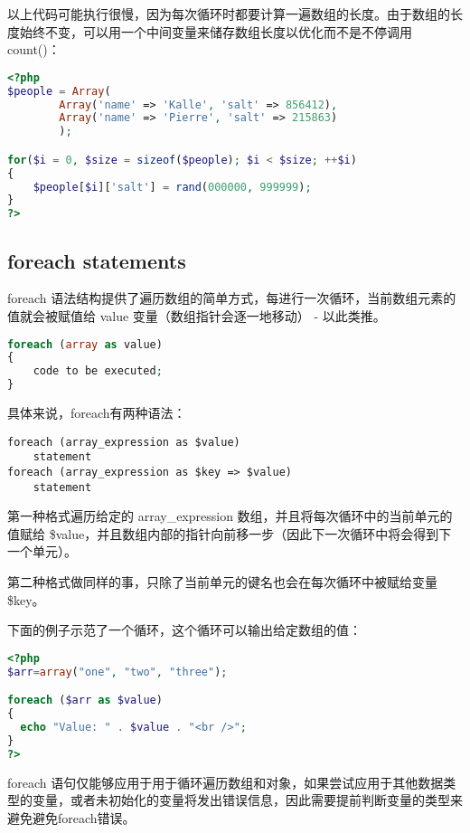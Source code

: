 以上代码可能执行很慢，因为每次循环时都要计算一遍数组的长度。由于数组的长度始终不变，可以用一个中间变量来储存数组长度以优化而不是不停调用 count()：

\begin{lstlisting}[language=PHP]
<?php
$people = Array(
        Array('name' => 'Kalle', 'salt' => 856412), 
        Array('name' => 'Pierre', 'salt' => 215863)
        );

for($i = 0, $size = sizeof($people); $i < $size; ++$i)
{
    $people[$i]['salt'] = rand(000000, 999999);
}
?>
\end{lstlisting}


\subsection{foreach statements}



foreach 语法结构提供了遍历数组的简单方式，每进行一次循环，当前数组元素的值就会被赋值给 value 变量（数组指针会逐一地移动） - 以此类推。


\begin{lstlisting}[language=PHP]
foreach (array as value)
{
    code to be executed;
}
\end{lstlisting}

具体来说，foreach有两种语法：

\begin{verbatim}
foreach (array_expression as $value)
    statement
foreach (array_expression as $key => $value)
    statement
\end{verbatim}

第一种格式遍历给定的 array\_expression 数组，并且将每次循环中的当前单元的值赋给 \$value，并且数组内部的指针向前移一步（因此下一次循环中将会得到下一个单元）。

第二种格式做同样的事，只除了当前单元的键名也会在每次循环中被赋给变量 \$key。



下面的例子示范了一个循环，这个循环可以输出给定数组的值：

\begin{lstlisting}[language=PHP]
<?php
$arr=array("one", "two", "three");

foreach ($arr as $value)
{
  echo "Value: " . $value . "<br />";
}
?>
\end{lstlisting}

foreach 语句仅能够应用于用于循环遍历数组和对象，如果尝试应用于其他数据类型的变量，或者未初始化的变量将发出错误信息，因此需要提前判断变量的类型来避免避免foreach错误。

